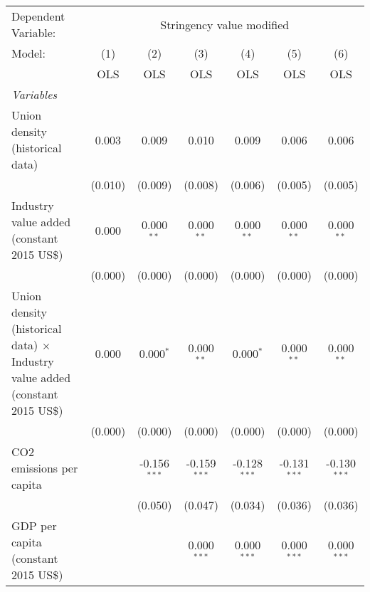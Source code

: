 
\begingroup
\centering
\begin{tabular}{lcccccc}
   \toprule
   Dependent Variable: & \multicolumn{6}{c}{Stringency value modified}\\
   Model:                                                                               & (1)     & (2)            & (3)            & (4)            & (5)            & (6)\\  
                                                                                        &  OLS    & OLS            & OLS            & OLS            & OLS            & OLS\\  
   \midrule
   \emph{Variables}\\
   Union density (historical data)                                                      & 0.003   & 0.009          & 0.010          & 0.009          & 0.006          & 0.006\\   
                                                                                        & (0.010) & (0.009)        & (0.008)        & (0.006)        & (0.005)        & (0.005)\\   
   Industry value added (constant 2015 US\$)                                            & 0.000   & 0.000$^{**}$   & 0.000$^{**}$   & 0.000$^{**}$   & 0.000$^{**}$   & 0.000$^{**}$\\   
                                                                                        & (0.000) & (0.000)        & (0.000)        & (0.000)        & (0.000)        & (0.000)\\   
   Union density (historical data) $\times$ Industry value added (constant 2015 US\$)   & 0.000   & 0.000$^{*}$    & 0.000$^{**}$   & 0.000$^{*}$    & 0.000$^{**}$   & 0.000$^{**}$\\   
                                                                                        & (0.000) & (0.000)        & (0.000)        & (0.000)        & (0.000)        & (0.000)\\   
   CO2 emissions per capita                                                             &         & -0.156$^{***}$ & -0.159$^{***}$ & -0.128$^{***}$ & -0.131$^{***}$ & -0.130$^{***}$\\   
                                                                                        &         & (0.050)        & (0.047)        & (0.034)        & (0.036)        & (0.036)\\   
   GDP per capita (constant 2015 US\$)                                                  &         &                & 0.000$^{***}$  & 0.000$^{***}$  & 0.000$^{***}$  & 0.000$^{***}$\\   

\end{tabular}

